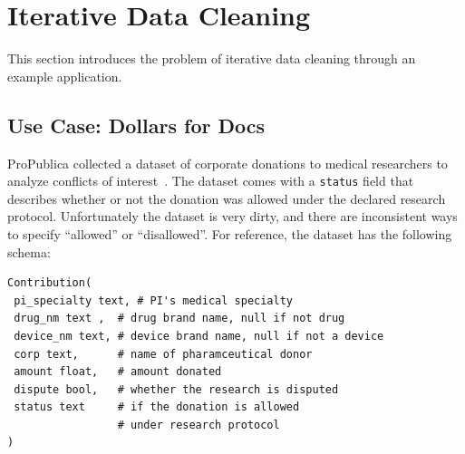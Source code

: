 \section{Iterative Data Cleaning}\label{background}
This section introduces the problem of iterative data cleaning through an example application.

\subsection{Use Case: Dollars for Docs}\label{s:usecase}
ProPublica collected a dataset of corporate donations to medical researchers to analyze conflicts of interest~\cite{dollarsfordocsa}. 
The dataset comes with a \texttt{status} field that describes whether or not the donation was allowed under the declared research protocol.
Unfortunately the dataset is very dirty, and there are inconsistent ways to specify ``allowed'' or ``disallowed''.
For reference, the dataset has the following schema:

{\ssmall\begin{verbatim}
Contribution(
 pi_specialty text, # PI's medical specialty
 drug_nm text ,  # drug brand name, null if not drug
 device_nm text, # device brand name, null if not a device
 corp text,      # name of pharamceutical donor
 amount float,   # amount donated
 dispute bool,   # whether the research is disputed
 status text     # if the donation is allowed 
                 # under research protocol
)
\end{verbatim}
}

% 
% 
% 
% 
% 
% 
% 



